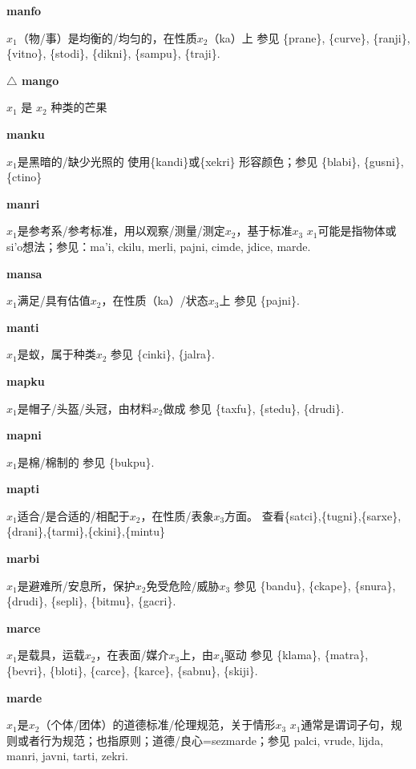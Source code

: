 \documentclass[notitlepage,twocolumn,a4paper,10pt]{book}
\begin{document}
{\sffamily\bfseries manfo} $x_1$（物\slash{}事）是均衡的\slash{}均匀的，在性质$x_2$（ka）上 \textemdash{} 参见 \{prane\}, \{curve\}, \{ranji\}, \{vitno\}, \{stodi\}, \{dikni\}, \{sampu\}, \{traji\}.

{\sffamily\bfseries $\triangle$ mango} $x_1$ 是 $x_2$ 种类的芒果

{\sffamily\bfseries manku}\enspace {\ttfamily\bfseries[man]}  $x_1$是黑暗的\slash{}缺少光照的 \textemdash{} 使用\{kandi\}或\{xekri\} 形容颜色；参见 \{blabi\}, \{gusni\}, \{ctino\}

{\sffamily\bfseries manri}\enspace {\ttfamily\bfseries[mar]}  $x_1$是参考系\slash{}参考标准，用以观察\slash{}测量\slash{}测定$x_2$，基于标准$x_3$ \textemdash{} $x_1$可能是指物体或si'o想法；参见：{ma'i}, {ckilu}, {merli}, {pajni}, {cimde}, {jdice}, {marde}.

{\sffamily\bfseries mansa} $x_1$满足\slash{}具有估值$x_2$，在性质（ka）\slash{}状态$x_3$上 \textemdash{} 参见 \{pajni\}.

{\sffamily\bfseries manti} $x_1$是蚁，属于种类$x_2$ \textemdash{} 参见 \{cinki\}, \{jalra\}.

{\sffamily\bfseries mapku}\enspace {\ttfamily\bfseries[map]}  $x_1$是帽子\slash{}头盔\slash{}头冠，由材料$x_2$做成 \textemdash{} 参见 \{taxfu\}, \{stedu\}, \{drudi\}.

{\sffamily\bfseries mapni} $x_1$是棉\slash{}棉制的 \textemdash{} 参见 \{bukpu\}.

{\sffamily\bfseries mapti}\enspace {\ttfamily\bfseries[mat]}  $x_1$适合\slash{}是合适的\slash{}相配于$x_2$，在性质\slash{}表象$x_3$方面。 \textemdash{} 查看\{satci\},\{tugni\},\{sarxe\},\{drani\},\{tarmi\},\{ckini\},\{mintu\}

{\sffamily\bfseries marbi}\enspace {\ttfamily\bfseries[    mra]}  $x_1$是避难所\slash{}安息所，保护$x_2$免受危险\slash{}威胁$x_3$ \textemdash{} 参见 \{bandu\}, \{ckape\}, \{snura\}, \{drudi\}, \{sepli\}, \{bitmu\}, \{gacri\}.

{\sffamily\bfseries marce}\enspace {\ttfamily\bfseries[        ma'e]}  $x_1$是载具，运载$x_2$，在表面\slash{}媒介$x_3$上，由$x_4$驱动 \textemdash{} 参见 \{klama\}, \{matra\}, \{bevri\}, \{bloti\}, \{carce\}, \{karce\}, \{sabnu\}, \{skiji\}.

{\sffamily\bfseries marde}\enspace {\ttfamily\bfseries[mad]}  $x_1$是$x_2$（个体\slash{}团体）的道德标准\slash{}伦理规范，关于情形$x_3$ \textemdash{} $x_1$通常是谓词子句，规则或者行为规范；也指原则；道德\slash{}良心={sezmarde}；参见 {palci}, {vrude}, {lijda}, {manri}, {javni}, {tarti}, {zekri}.
\end{document}
